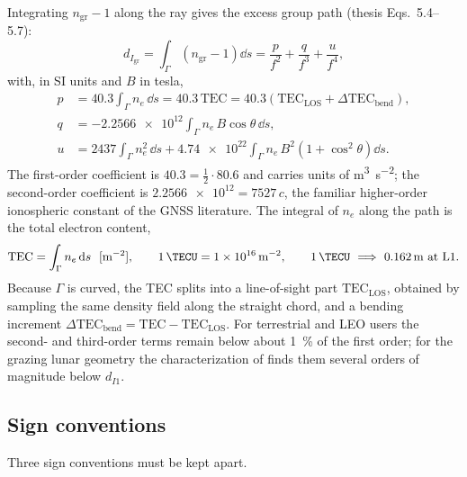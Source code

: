 Integrating $n_\mathrm{gr}-1$ along the ray gives the excess group path (thesis
Eqs.~5.4--5.7):
%
\begin{equation}
  \label{eq:iono-delay-orders}
  d_{I_\mathrm{gr}} = \int_\Gamma \left(n_\mathrm{gr}-1\right)\dd s
    = \frac{p}{f^2} + \frac{q}{f^3} + \frac{u}{f^4} ,
\end{equation}
%
with, in SI units and $B$ in tesla,
%
\begin{align}
  \label{eq:iono-p}
  p &= 40.3 \int_\Gamma n_e\,\dd s
     = 40.3\,\mathrm{TEC}
     = 40.3\left(\mathrm{TEC}_\mathrm{LOS} + \Delta\mathrm{TEC}_\mathrm{bend}\right) , \\
  \label{eq:iono-q}
  q &= -\num{2.2566e12} \int_\Gamma n_e\, B \cos\theta\,\dd s , \\
  \label{eq:iono-u}
  u &= 2437 \int_\Gamma n_e^2\,\dd s
     + \num{4.74e22} \int_\Gamma n_e\, B^2 \left(1+\cos^2\theta\right)\dd s .
\end{align}
%
The first-order coefficient is $40.3 = \tfrac{1}{2}\cdot 80.6$ and carries units
of \si{\meter\cubed\per\square\second}; the second-order coefficient is
$\num{2.2566e12} = 7527\,c$, the familiar higher-order ionospheric constant of
the GNSS literature.  The integral of $n_e$ along the path is the total electron
content,
%
\begin{equation}
  \label{eq:iono-tecu}
  \mathrm{TEC} = \int_\Gamma n_e\,\dd s\ \ [\si{\per\square\meter}],
  \qquad
  \SI{1}{\TECU} = \num{1e16}\,\si{\per\square\meter},
  \qquad
  \SI{1}{\TECU} \ \Longrightarrow\ \SI{0.162}{\meter}\ \text{at L1} .
\end{equation}
%
Because $\Gamma$ is curved, the TEC splits into a line-of-sight part
$\mathrm{TEC}_\mathrm{LOS}$, obtained by sampling the same density field along
the straight chord, and a bending increment
$\Delta\mathrm{TEC}_\mathrm{bend} = \mathrm{TEC} - \mathrm{TEC}_\mathrm{LOS}$.
For terrestrial and LEO users the second- and third-order terms remain below
about \SI{1}{\percent} of the first order; for the grazing lunar geometry the
characterization of \citep[Tab.~5.2]{iiyama2026thesis} finds them several orders
of magnitude below $d_{I1}$.

\subsection{Sign conventions}
\label{sec:iono-signs}

Three sign conventions must be kept apart.

